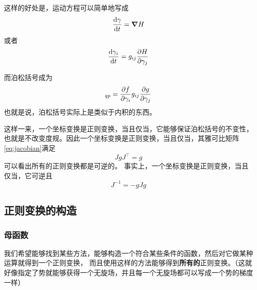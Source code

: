 \documentclass[UTF8, a4paper]{ctexart}
\begin{document}
这样的好处是，运动方程可以简单地写成
\begin{equation}
    \dv{\gamma}{t} = \grad H
\end{equation}
或者
\begin{equation}
    \dv{\gamma_i}{t} = g_{ij} \pdv{H}{\gamma_j}
\end{equation}

而泊松括号成为
\begin{equation}
    [f, g]_{qp} = \pdv{f}{\gamma_i} g_{ij} \pdv{g}{\gamma_j}
\end{equation}
也就是说，泊松括号实际上是类似于内积的东西。

这样一来，一个坐标变换是正则变换，当且仅当，它能够保证泊松括号的不变性，也就是不改变度规。因此一个坐标变换是正则变换，当且仅当，其雅可比矩阵\eqref{eq:jacobian}满足
\begin{equation}
    J g J^\top = g
\end{equation}
可以看出所有的正则变换都是可逆的。
事实上，一个坐标变换是正则变换，当且仅当，它可逆且
\begin{equation}
    J^{-1} = -g J g
\end{equation}

\subsection{正则变换的构造}\label{sec:canonical-transformation-construction}

\subsubsection{母函数}

我们希望能够找到某些方法，能够构造一个符合某些条件的函数，然后对它做某种运算就得到一个正则变换，
而且使用这样的方法能够得到\textbf{所有的}正则变换。（这就好像指定了势就能够获得一个无旋场，并且每一个无旋场都可以写成一个势的梯度一样）
\end{document}
